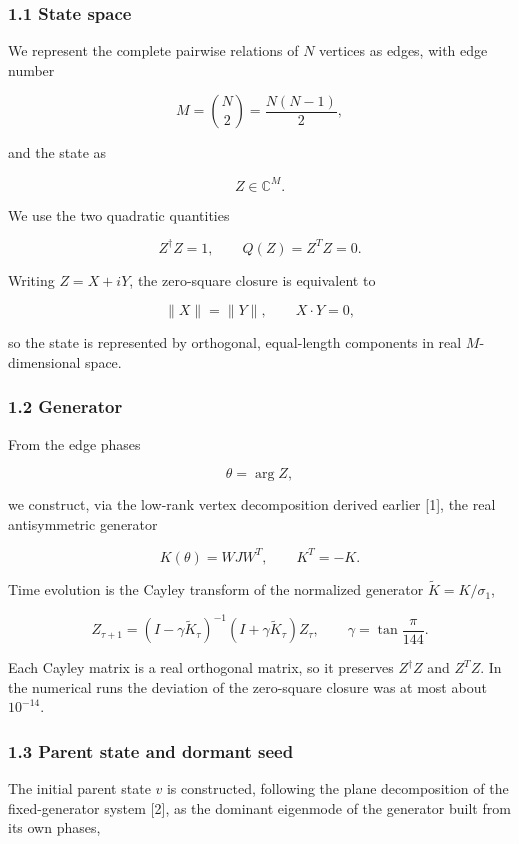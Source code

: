 \documentclass[
  a4paper,
]{article}
\begin{document}
\subsubsection{1.1 State space}\label{state-space}

We represent the complete pairwise relations of \(N\) vertices as edges,
with edge number

\[
M=\binom{N}{2}=\frac{N(N-1)}{2},
\]

and the state as

\[
Z\in\mathbb C^M.
\]

We use the two quadratic quantities

\[
Z^\dagger Z=1,
\qquad
Q(Z)=Z^T Z=0.
\]

Writing \(Z=X+iY\), the zero-square closure is equivalent to

\[
\|X\|=\|Y\|,
\qquad
X\cdot Y=0,
\]

so the state is represented by orthogonal, equal-length components in
real \(M\)-dimensional space.

\subsubsection{1.2 Generator}\label{generator}

From the edge phases

\[
\theta=\arg Z,
\]

we construct, via the low-rank vertex decomposition derived earlier
{[}1{]}, the real antisymmetric generator

\[
K(\theta)=WJW^T,
\qquad
K^T=-K.
\]

Time evolution is the Cayley transform of the normalized generator
\(\widetilde K=K/\sigma_1\),

\[
Z_{\tau+1}
=
\left(I-\gamma\widetilde K_\tau\right)^{-1}
\left(I+\gamma\widetilde K_\tau\right)Z_\tau,
\qquad
\gamma=\tan\frac{\pi}{144}.
\]

Each Cayley matrix is a real orthogonal matrix, so it preserves
\(Z^\dagger Z\) and \(Z^T Z\). In the numerical runs the deviation of
the zero-square closure was at most about \(10^{-14}\).

\subsubsection{1.3 Parent state and dormant
seed}\label{parent-state-and-dormant-seed}

The initial parent state \(v\) is constructed, following the plane
decomposition of the fixed-generator system {[}2{]}, as the dominant
eigenmode of the generator built from its own phases,
\end{document}
